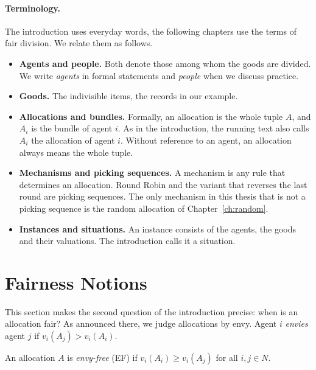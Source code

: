 \paragraph{Terminology.}
The introduction uses everyday words, the following chapters use the terms of fair division. We
relate them as follows.
\begin{itemize}
  \item \textbf{Agents and people.} Both denote those among whom the goods are divided. We write
  \textit{agents} in formal statements and \textit{people} when we discuss practice.
  \item \textbf{Goods.} The indivisible items, the records in our example.
  \item \textbf{Allocations and bundles.} Formally, an allocation is the whole tuple $A$, and
  $A_i$ is the bundle of agent $i$. As in the introduction, the running text also calls $A_i$ the
  allocation of agent $i$. Without reference to an agent, an allocation always means the whole
  tuple.
  \item \textbf{Mechanisms and picking sequences.} A mechanism is any rule that determines an
  allocation. Round Robin and the variant that reverses the last round are picking sequences.
  The only mechanism in this thesis that is not a picking sequence is the random allocation of
  Chapter~\ref{ch:random}.
  \item \textbf{Instances and situations.} An instance consists of the agents, the goods and their
  valuations. The introduction calls it a situation.
\end{itemize}


\section{Fairness Notions}\label{sec:notions}

This section makes the second question of the introduction precise: when is an allocation fair?
As announced there, we judge allocations by envy. Agent $i$ \textit{envies} agent $j$ if
$v_i(A_j)>v_i(A_i)$.

\begin{definition}
An allocation $A$ is \textit{envy-free} (EF) if $v_i(A_i)\geq v_i(A_j)$ for all $i,j\in N$.
\end{definition}

